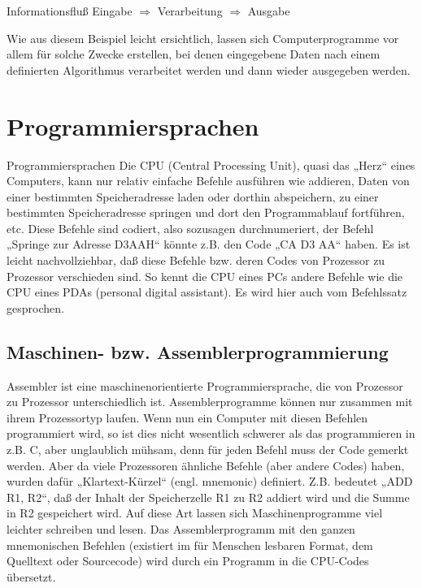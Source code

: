 \begin{myfigure}{Informationsfluß}
	\huge	Eingabe 
		$\Rightarrow$
		Verarbeitung
		$\Rightarrow$
		Ausgabe
\end{myfigure}



Wie aus diesem Beispiel leicht ersichtlich, lassen sich Computerprogramme vor allem für solche Zwecke erstellen, bei denen eingegebene Daten nach einem definierten Algorithmus verarbeitet werden und dann wieder ausgegeben werden. 

\section{Programmiersprachen}	Programmiersprachen
Die CPU (Central Processing Unit), quasi das „Herz“ eines Computers, kann nur relativ einfache Befehle ausführen wie addieren, Daten von einer bestimmten Speicheradresse laden oder dorthin abspeichern, zu einer bestimmten Speicheradresse springen und dort den Programmablauf fortführen, etc.
Diese Befehle sind codiert, also sozusagen durchnumeriert, der Befehl „Springe zur Adresse D3AAH“ könnte z.B. den Code „CA D3 AA“ haben. Es ist leicht nachvollziehbar, daß diese Befehle bzw. deren Codes von Prozessor zu Prozessor verschieden sind. So kennt die CPU eines PCs andere Befehle wie die CPU eines PDAs (personal digital assistant). Es wird hier auch vom Befehlssatz gesprochen.

\subsection{Maschinen- bzw. Assemblerprogrammierung}
Assembler ist eine maschinenorientierte Programmiersprache, die von Prozessor zu Prozessor unterschiedlich ist. Assemblerprogramme können nur zusammen mit ihrem Prozessortyp laufen. Wenn nun ein Computer mit diesen Befehlen programmiert wird, so ist dies nicht wesentlich schwerer als das programmieren in z.B. C, aber unglaublich mühsam, denn für jeden Befehl muss der Code gemerkt werden. Aber da viele Prozessoren ähnliche Befehle (aber andere Codes) haben, wurden dafür „Klartext-Kürzel“ (engl. mnemonic) definiert. Z.B. bedeutet „ADD R1, R2“, daß der Inhalt der Speicherzelle R1 zu R2 addiert wird und die Summe in R2 gespeichert wird.
Auf diese Art lassen sich Maschinenprogramme viel leichter schreiben und lesen. Das Assemblerprogramm mit den ganzen mnemonischen Befehlen (existiert im für Menschen lesbaren Format, dem Quelltext oder Sourcecode) wird durch ein Programm in die CPU-Codes übersetzt. 

